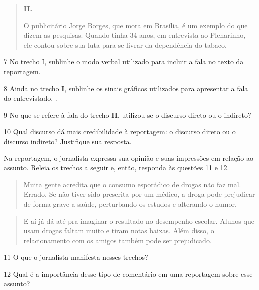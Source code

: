 \begin{quote}
\textbf{II.}

O publicitário Jorge Borges, que mora em Brasília, é um exemplo do que
dizem as pesquisas. Quando tinha 34 anos, em entrevista ao Plenarinho,
ele contou sobre sua luta para se livrar da dependência do
tabaco.
\end{quote}

\num{7} No trecho I, sublinhe o modo verbal utilizado para incluir a
fala no texto da reportagem. 

\num{8} Ainda no trecho \textbf{I}, sublinhe os sinais gráficos
utilizados para apresentar a fala do entrevistado.
.

\num{9} No que se refere à fala do trecho \textbf{II}, utilizou-se o
discurso direto ou o indireto?


\num{10} Qual discurso dá mais credibilidade à reportagem: o discurso
direto ou o discurso indireto? Justifique sua resposta.


Na reportagem, o jornalista expressa sua opinião e suas impressões em
relação ao assunto. Releia os trechos a seguir e, então, responda às
questões 11 e 12.

\begin{quote}
Muita gente acredita que o consumo esporádico de drogas não faz mal.
Errado. Se não tiver sido prescrita por um médico, a droga pode
prejudicar de forma grave a saúde, perturbando os estudos e alterando o
humor.
\end{quote}

\begin{quote}
E aí já dá até pra imaginar o resultado no desempenho escolar. Alunos
que usam drogas faltam muito e tiram notas baixas. Além disso, o
relacionamento com os amigos também pode ser prejudicado.
\end{quote}

\num{11} O que o jornalista manifesta nesses trechos?


\num{12} Qual é a importância desse tipo de comentário em uma reportagem
sobre esse assunto?


